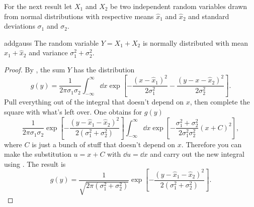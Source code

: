 For the next result
let $X_1$ and $X_2$ be two independent random variables drawn from normal
distributions with respective means $\hat{x}_1$ and $\hat{x}_2$ and
standard deviations $\sigma_1$ and $\sigma_2$.
\begin{proposition}{}{addgauss}
  The random variable $Y=X_1+X_2$ is normally distributed with mean
  $\hat{x}_1+\hat{x}_2$ and variance $\sigma_1^2+\sigma_2^2$.
  \begin{proof}
    By , the sum $Y$ has the distribution
    \begin{equation*}
      g(y)=\frac{1}{2\pi\sigma_1\sigma_2}
           \int_{-\infty}^\infty\dd{x}\exp\left[
             -\frac{(x-\hat{x}_1)^2}{2\sigma_1^2}
             -\frac{(y-x-\hat{x}_2)^2}{2\sigma_2^2}\right].
    \end{equation*}
    Pull everything out of the integral that doesn't depend on $x$,
    then complete the square with what's left over.
    One obtains for $g(y)$
    $$
      \frac{1}{2\pi\sigma_1\sigma_2}
           \exp\left[-\frac{(y-\hat{x}_1-\hat{x}_2)^2}
                      {2(\sigma_1^2+\sigma_2^2)}\right]
           \int_{-\infty}^\infty\dd{x}
           \exp\left[-\frac{\sigma_1^2+\sigma_2^2}
                     {2\sigma_1^2\sigma_2^2}(x+C)^2\right],
    $$
    where $C$ is just a bunch of stuff that doesn't depend on $x$.
    Therefore you can make the substitution $u=x+C$ with $\dd u=\dd x$ and
    carry out the new integral using .
    The result is
    \begin{equation*}
      g(y)=\frac{1}{\sqrt{2\pi(\sigma_1^2+\sigma_2^2)}}
           \exp\left[-\frac{(y-\hat{x}_1-\hat{x}_2)^2}
                      {2(\sigma_1^2+\sigma_2^2)}\right].
    \end{equation*}
  \end{proof}
\end{proposition}

